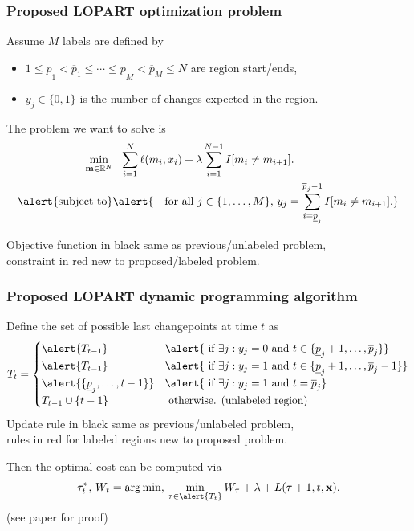 \documentclass{beamer}
\DeclareMathOperator*{\argmin}{arg\,min}
\begin{document}
\begin{frame}
  \frametitle{Proposed LOPART optimization problem}

  Assume $M$ labels are defined by
  \begin{itemize}
  \item $  1 \leq 
\underline p_1 < \overline p_1 \leq 
\cdots \leq 
\underline p_M < \overline p_M \leq 
N$ are region start/ends,
  \item $y_j\in\{0,1\}$ is the number of changes expected in the region.
  \end{itemize}
  The problem we want to solve is
\begin{align}
 \min_{
  \mathbf m\in\mathbb R^{N}
  } &\ \ 
  \nonumber
\sum_{i=1}^{N} 
    \ell(m_i, x_i) 
    +\lambda
 \sum_{i=1}^{N-1}
    I[m_i \neq m_{i+1}].
\\
  \alert{\text{subject to} }
    &
      \alert{\ \ \text{ for all } j\in\{1,\dots,M\},\,
y_j = \sum_{i=\underline p_j}^{\overline p_j-1}
    I[m_i \neq m_{i+1}].}
\nonumber
\end{align}

Objective function in black same as previous/unlabeled problem,\\
\alert{constraint in red new to proposed/labeled problem}.

\end{frame}

\begin{frame}
  \frametitle{Proposed LOPART dynamic programming algorithm}
Define the set of possible last changepoints at time $t$ as
\begin{equation*}
    T_t = \begin{cases}
      \alert{T_{t-1}} & \alert{
        \text{ if } 
        \exists j: y_j=0 \text{ and } 
        t\in \{\underline p_j + 1, \dots, \overline p_j \}
      }
      \\
      \alert{T_{t-1}} & \alert{
        \text{ if } 
        \exists j: y_j=1 \text{ and } 
        t\in \{\underline p_j + 1, \dots, \overline p_j - 1\}
      }
      \\
      \alert{\{\underline p_j, \dots, t-1\}} & \alert{
        \text{ if } 
        \exists j: y_j=1 \text{ and } 
        t= \overline p_j
      }
      \\
    T_{t-1}\cup \{t-1\} & \text{ otherwise. (unlabeled region)} 
    \end{cases}
  \end{equation*}
Update rule in black same as previous/unlabeled problem,\\
\alert{rules in red for labeled regions new to proposed problem}.
  
Then the optimal cost can be computed via
\begin{equation*}
  \tau^*_t,\,  W_t = \argmin,\, \min_{\tau \in \alert{T_t}}  W_\tau + \lambda + L(\tau+1, t, \mathbf x).
  \end{equation*}
(see paper for proof)

\end{frame}
\end{document}
